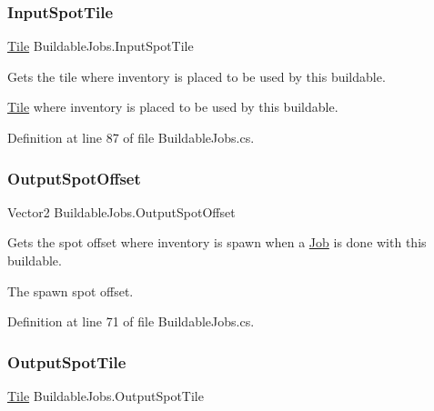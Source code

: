 \subsubsection{\texorpdfstring{Input\+Spot\+Tile}{InputSpotTile}}
{\footnotesize\ttfamily \hyperlink{class_tile}{Tile} Buildable\+Jobs.\+Input\+Spot\+Tile\hspace{0.3cm}{\ttfamily [get]}}



Gets the tile where inventory is placed to be used by this buildable. 

\hyperlink{class_tile}{Tile} where inventory is placed to be used by this buildable.

Definition at line 87 of file Buildable\+Jobs.\+cs.

\mbox{\label{class_buildable_jobs_ad42e0dc5d8bd26fa606e37bb8846ac99}} 
\subsubsection{\texorpdfstring{Output\+Spot\+Offset}{OutputSpotOffset}}
{\footnotesize\ttfamily Vector2 Buildable\+Jobs.\+Output\+Spot\+Offset\hspace{0.3cm}{\ttfamily [get]}}



Gets the spot offset where inventory is spawn when a \hyperlink{class_job}{Job} is done with this buildable. 

The spawn spot offset.

Definition at line 71 of file Buildable\+Jobs.\+cs.

\mbox{\label{class_buildable_jobs_aa8bda994afc1614cb14f9021f3c6e3ac}} 
\subsubsection{\texorpdfstring{Output\+Spot\+Tile}{OutputSpotTile}}
{\footnotesize\ttfamily \hyperlink{class_tile}{Tile} Buildable\+Jobs.\+Output\+Spot\+Tile\hspace{0.3cm}{\ttfamily [get]}}




